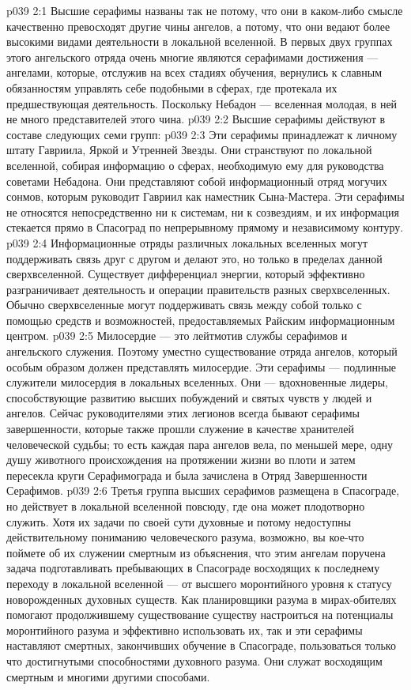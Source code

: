 \vs p039 2:1 Высшие серафимы названы так не потому, что они в каком\hyp{}либо смысле качественно превосходят другие чины ангелов, а потому, что они ведают более высокими видами деятельности в локальной вселенной. В первых двух группах этого ангельского отряда очень многие являются серафимами достижения --- ангелами, которые, отслужив на всех стадиях обучения, вернулись к славным обязанностям управлять себе подобными в сферах, где протекала их предшествующая деятельность. Поскольку Небадон --- вселенная молодая, в ней не много представителей этого чина.
\vs p039 2:2 Высшие серафимы действуют в составе следующих семи групп:
\vs p039 2:3 \bibnobreakspace {} Эти серафимы принадлежат к личному штату Гавриила, Яркой и Утренней Звезды. Они странствуют по локальной вселенной, собирая информацию о сферах, необходимую ему для руководства советами Небадона. Они представляют собой информационный отряд могучих сонмов, которым руководит Гавриил как наместник Сына\hyp{}Мастера. Эти серафимы не относятся непосредственно ни к системам, ни к созвездиям, и их информация стекается прямо в Спасоград по непрерывному прямому и независимому контуру.
\vs p039 2:4 Информационные отряды различных локальных вселенных могут поддерживать связь друг с другом и делают это, но только в пределах данной сверхвселенной. Существует дифференциал энергии, который эффективно разграничивает деятельность и операции правительств разных сверхвселенных. Обычно сверхвселенные могут поддерживать связь между собой только с помощью средств и возможностей, предоставляемых Райским информационным центром.
\vs p039 2:5 \bibnobreakspace {} Милосердие --- это лейтмотив службы серафимов и ангельского служения. Поэтому уместно существование отряда ангелов, который особым образом должен представлять милосердие. Эти серафимы --- подлинные служители милосердия в локальных вселенных. Они --- вдохновенные лидеры, способствующие развитию высших побуждений и святых чувств у людей и ангелов. Сейчас руководителями этих легионов всегда бывают серафимы завершенности, которые также прошли служение в качестве хранителей человеческой судьбы; то есть каждая пара ангелов вела, по меньшей мере, одну душу животного происхождения на протяжении жизни во плоти и затем пересекла круги Серафимограда и была зачислена в Отряд Завершенности Серафимов.
\vs p039 2:6 \bibnobreakspace {} Третья группа высших серафимов размещена в Спасограде, но действует в локальной вселенной повсюду, где она может плодотворно служить. Хотя их задачи по своей сути духовные и потому недоступны действительному пониманию человеческого разума, возможно, вы кое\hyp{}что поймете об их служении смертным из объяснения, что этим ангелам поручена задача подготавливать пребывающих в Спасограде восходящих к последнему переходу в локальной вселенной --- от высшего моронтийного уровня к статусу новорожденных духовных существ. Как планировщики разума в мирах\hyp{}обителях помогают продолжившему существование существу настроиться на потенциалы моронтийного разума и эффективно использовать их, так и эти серафимы наставляют смертных, закончивших обучение в Спасограде, пользоваться только что достигнутыми способностями духовного разума. Они служат восходящим смертным и многими другими способами.
